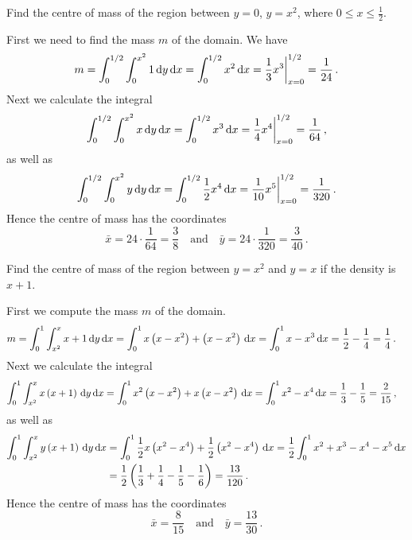 \begin{question}
Find the centre of mass of the region between $y=0$, $y=x^2$, where $0 \leq x \leq \frac 12$.
\end{question}

\begin{solution}
First we need to find the mass $m$ of the domain. We have
\begin{align*}
m = \int_0^{1/2} \int_0^{x^2} 1 \,\mathrm{d} y \,\mathrm{d} x
= \int_0^{1/2} x^2 \,\mathrm{d} x = \frac 13 x^3 \bigg|_{x=0}^{1/2} = \frac 1{24}\,.
\end{align*}
Next we calculate the integral
\begin{align*}
\int_0^{1/2} \int_0^{x^2} x \,\mathrm{d} y \,\mathrm{d} x = \int_0^{1/2} x^3 \,\mathrm{d} x = \frac 14 x^4 \bigg|_{x=0}^{1/2} = \frac{1}{64}\,,
\end{align*}
as well as
\begin{align*}
\int_0^{1/2} \int_0^{x^2} y \,\mathrm{d} y \,\mathrm{d} x = \int_0^{1/2} \frac 12 x^4 \,\mathrm{d} x = \frac 1{10} x^5 \bigg|_{x=0}^{1/2} = \frac{1}{320}\,.
\end{align*}
Hence the centre of mass has the coordinates
\[
\bar x = 24 \cdot \frac 1{64} = \frac 38
\quad\text{and}\quad
\bar y = 24 \cdot \frac 1{320} = \frac 3{40} \,.
\]
\end{solution}

\begin{question}
Find the centre of mass of the region between $y=x^2$ and $y=x$ if the density is $x+1$.
\end{question}

\begin{solution}
First we compute the mass $m$ of the domain.
\begin{align*}
m &= \int_0^1 \int_{x^2}^x x+1 \,\mathrm{d} y \,\mathrm{d} x
= \int_0^1 x \left(x-x^2\right) + \left(x - x^2\right) \,\mathrm{d} x
= \int_0^1 x-x^3 \,\mathrm{d} x
= \frac 12 - \frac 14 = \frac 14\,.
\end{align*}
Next we calculate the integral
\begin{align*}
\int_0^1 \int_{x^2}^x x\left(x+1\right) \,\mathrm{d} y \,\mathrm{d} x
&= \int_0^1 x^2\left(x - x^2 \right) + x \left( x - x^2 \right) \,\mathrm{d} x
= \int_0^1 x^2 - x^4 \,\mathrm{d} x
= \frac 13 - \frac 15 = \frac{2}{15}\,,
\end{align*}
as well as
\begin{align*}
\int_0^1 \int_{x^2}^x y\left(x + 1 \right) \,\mathrm{d} y \,\mathrm{d} x
&= \int_0^1 \frac 12 x\left(x^2 - x^4 \right) + \frac 12 \left(x^2 - x^4\right) \,\mathrm{d} x
= \frac 12 \int_0^1 x^2 + x^3 - x^4 - x^5 \,\mathrm{d} x \\
&= \frac 12 \left( \frac 13 + \frac 14 - \frac 15 - \frac 16\right)
= \frac {13}{120}\,.
\end{align*}
Hence the centre of mass has the coordinates
\[
\bar x = \frac{8}{15}
\quad\text{and}\quad
\bar y = \frac {13}{30}\,.
\]
\end{solution}

